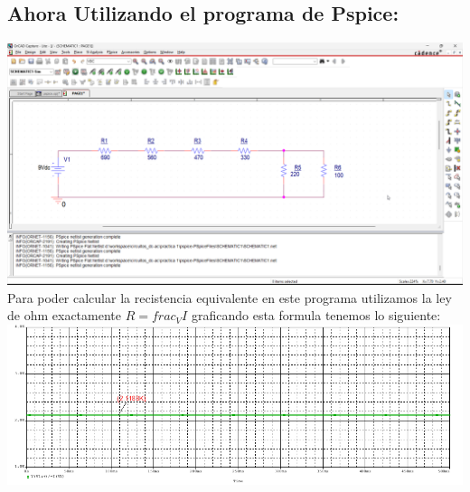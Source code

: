 \documentclass[10pt]{article}
\begin{document}
\begin{multicols}{2}
\subsection{Ahora Utilizando el programa de Pspice:}
\includegraphics[width=\linewidth]{Imagenes/psipce.png}
Para poder calcular la recistencia equivalente en este programa utilizamos la ley de ohm exactamente $R=frac_{V}{I}$ graficando esta formula tenemos lo siguiente: 
\includegraphics[width=\linewidth]{Imagenes/reseq.png}


\end{multicols}
\end{document}
